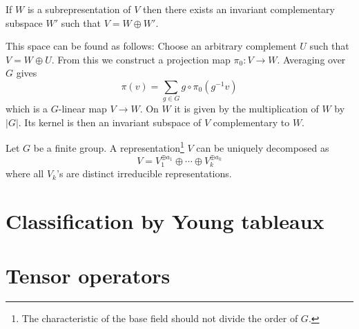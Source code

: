        \begin{property}
            If $W$ is a subrepresentation of $V$ then there exists an invariant complementary subspace $W'$ such that $V = W \oplus W'$.

            This space can be found as follows: Choose an arbitrary complement $U$ such that $V = W \oplus U$. From this we construct a projection map $\pi_0:V \rightarrow W$. Averaging over $G$ gives
            \begin{equation}
                \pi(v) = \sum_{g\in G}g\circ\pi_0(g^{-1}v)
            \end{equation}
            which is a $G$-linear map $V\rightarrow W$. On $W$ it is given by the multiplication of $W$ by $|G|$. Its kernel is then an invariant subspace of $V$ complementary to $W$.
        \end{property}
        \begin{theorem}[Maschke]
            Let $G$ be a finite group. A representation\footnote{The characteristic of the base field should not divide the order of $G$.} $V$ can be uniquely decomposed as
        \begin{equation}
                    V = V_1^{\oplus a_1}\oplus\cdots\oplus V_k^{\oplus a_k}
        \end{equation}
        where all $V_k$'s are distinct irreducible representations.
        \end{theorem}

\section{Classification by Young tableaux}



\section{Tensor operators}

